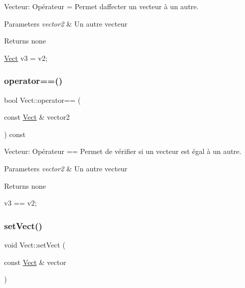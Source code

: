 Vecteur\+: Opérateur = Permet d\textquotesingle{}affecter un vecteur à un autre\textquotesingle{}. 


\begin{DoxyParams}{Parameters}
{\em vector2} & Un autre vecteur \\
\hline
\end{DoxyParams}
\begin{DoxyReturn}{Returns}
none 
\begin{DoxyCode}
\hyperlink{classVect}{Vect} v3 = v2;
\end{DoxyCode}
 
\end{DoxyReturn}
\mbox{\label{classVect_a4a436a5c1301158cebed48d624aa4a9c}} 
\subsubsection{\texorpdfstring{operator==()}{operator==()}}
{\footnotesize\ttfamily bool Vect\+::operator== (\begin{DoxyParamCaption}\item[{const \hyperlink{classVect}{Vect} \&}]{vector2 }\end{DoxyParamCaption}) const}



Vecteur\+: Opérateur == Permet de vérifier si un vecteur est égal à un autre. 


\begin{DoxyParams}{Parameters}
{\em vector2} & Un autre vecteur \\
\hline
\end{DoxyParams}
\begin{DoxyReturn}{Returns}
none 
\begin{DoxyCode}
v3 == v2;
\end{DoxyCode}
 
\end{DoxyReturn}
\mbox{\label{classVect_a28408435bc900905d3416aef70140cd9}} 
\subsubsection{\texorpdfstring{set\+Vect()}{setVect()}}
{\footnotesize\ttfamily void Vect\+::set\+Vect (\begin{DoxyParamCaption}\item[{const \hyperlink{classVect}{Vect} \&}]{vector }\end{DoxyParamCaption})}



